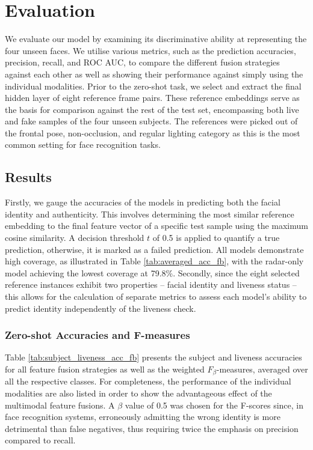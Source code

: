 \documentclass{mpaper}
\begin{document}
\section{Evaluation}
We evaluate our model by examining its discriminative ability at representing the four unseen faces. We utilise various metrics, such as the prediction accuracies, precision, recall, and ROC AUC, to compare the different fusion strategies against each other as well as showing their performance against simply using the individual modalities. Prior to the zero-shot task, we select and extract the final hidden layer of eight reference frame pairs. These reference embeddings serve as the basis for comparison against the rest of the test set, encompassing both live and fake samples of the four unseen subjects. The references were picked out of the frontal pose, non-occlusion, and regular lighting category as this is the most common setting for face recognition tasks.

\subsection{Results}
Firstly, we gauge the accuracies of the models in predicting both the facial identity and authenticity. This involves determining the most similar reference embedding to the final feature vector of a specific test sample using the maximum cosine similarity. A decision threshold $t$ of 0.5 is applied to quantify a true prediction, otherwise, it is marked as a failed prediction. All models demonstrate high coverage, as illustrated in Table \ref{tab:averaged_acc_fb}, with the radar-only model achieving the lowest coverage at 79.8\%. Secondly, since the eight selected reference instances exhibit two properties -- facial identity and liveness status -- this allows for the calculation of separate metrics to assess each model's ability to predict identity independently of the liveness check.

\subsubsection{Zero-shot Accuracies and F-measures}
Table \ref{tab:subject_liveness_acc_fb} presents the subject and liveness accuracies for all feature fusion strategies as well as the weighted $F_{\beta}$-measures, averaged over all the respective classes. For completeness, the performance of the individual modalities are also listed in order to show the advantageous effect of the multimodal feature fusions. A $\beta$ value of 0.5 was chosen for the F-scores since, in face recognition systems, erroneously admitting the wrong identity is more detrimental than false negatives, thus requiring twice the emphasis on precision compared to recall.
\end{document}
